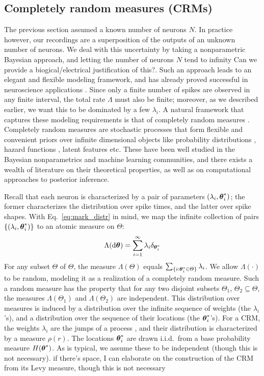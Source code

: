 \subsection{Completely random measures (CRMs)}

The previous section assumed a known number of neurons $N$. In practice however, our recordings are a superposition of the outputs of an unknown
number of neurons. We deal with this uncertainty by taking a nonparametric Bayesian approach, and letting the number of neurons $N$ tend to infinity
{\color{red} Can we provide a biogical/electrical justification of this?}. 
Such an approach leads to an elegant and flexible modeling framework, and has  already proved successful in neuroscience applications
\citep{WoodBla2008}.
Since only a finite number of spikes are observed in any finite interval, the total rate $\Lambda$ must 
also be finite; moreover, as we described earlier, we want this to be dominated by a few $\lambda_i$. 
A natural framework that captures these  modeling requirements is that of completely random measures \citep{Kingman:PJM67}.
Completely random measures are stochastic processes that form flexible and convenient priors over
infinite dimensional objects like probability distributions \citep{JamesLP09}, hazard functions \citep{Hjo1990}, latent features \citep{ThiJor2007} etc. 
These have been well studied in the Bayesian nonparametrics and machine learning communities, and there exists a wealth of literature on
their theoretical properties, as well as on computational approaches to posterior inference.

Recall that each neuron is characterized by a pair of parameters $(\lambda_i, \boldsymbol{\theta}^*_i)$; the former characterizes the distribution over spike times, 
and the latter over spike
shapes. With Eq.~\eqref{eq:mark_distr} in mind, we map the infinite collection of pairs $\{(\lambda_i, \boldsymbol{\theta}^*_i)\}$ to an atomic measure on $\Theta$:
\begin{align}
  \Lambda(\mathrm{d} \boldsymbol{\theta}) = \sum_{i=1}^{\infty} \lambda_i \delta_{\boldsymbol{\theta}^*_i}
\end{align}
For any subset $\varTheta$ of $\Theta$, the measure $\Lambda(\varTheta)$ equals \( \sum_{\{ i: \boldsymbol{\theta}^*_i \in \varTheta \} } \lambda_i\). We allow $\Lambda(\cdot)$ to be random,
modeling it as a realization of a completely random measure. Such a random measure has the property that for any two disjoint subsets $\varTheta_1$,  $\varTheta_2 \subseteq \Theta$, the measures $\Lambda(\varTheta_1)$ and $\Lambda(\varTheta_2)$ are independent. 
This distribution over measures is induced by a distribution
over the infinite sequence of weights (the $\lambda_i$'s), and a distribution over the sequence of their locations (the $\boldsymbol{\theta}^*_i$'s). 
For a CRM, the weights $\lambda_i$ are the jumps of a \Levy process \citep{Sato90}, and their distribution is characterized by a 
\Levy measure $\rho(r)$. The locations $\boldsymbol{\theta}^*_i$ are drawn i.i.d.\  from a base probability measure $H(\boldsymbol{\theta}^*)$.
As is typical, we assume these to be independent (though this is not necessary). {\color{red} if there's space, I
can elaborate on the construction of the CRM from its Levy measure, though this is not necessary}

